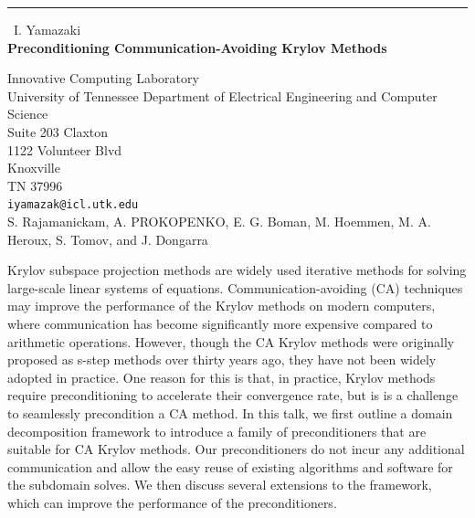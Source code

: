\documentclass{report}
\begin{document}
\begin{center}
\rule{6in}{1pt} \
{\large I. Yamazaki \\
{\bf Preconditioning Communication-Avoiding Krylov Methods}}

Innovative Computing Laboratory \\ University of Tennessee Department of Electrical Engineering and Computer Science \\ Suite 203 Claxton \\ 1122 Volunteer Blvd \\ Knoxville \\ TN 37996
\\
{\tt iyamazak@icl.utk.edu}\\
	S. Rajamanickam, A. PROKOPENKO, E. G. Boman, M. Hoemmen, M. A. Heroux,  S. Tomov, and J. Dongarra
	\end{center}

Krylov subspace projection methods are widely used iterative methods for
solving large-scale linear systems of equations. Communication-avoiding
(CA) techniques may improve the performance of the Krylov methods on
modern computers, where communication has become significantly more
expensive compared to arithmetic operations. However, though the CA
Krylov methods were originally proposed as s-step methods over thirty
years ago, they have not been widely adopted in practice. One reason for
this is that, in practice, Krylov methods require preconditioning to
accelerate their convergence rate, but is is a challenge to seamlessly
precondition a CA method. In this talk, we first outline a domain
decomposition framework to introduce a family of preconditioners that are
suitable for CA Krylov methods. Our preconditioners do not incur any
additional communication and allow the easy reuse of existing algorithms
and software for the subdomain solves. We then discuss several extensions
to the framework, which can improve the performance of the
preconditioners.
\end{document}
